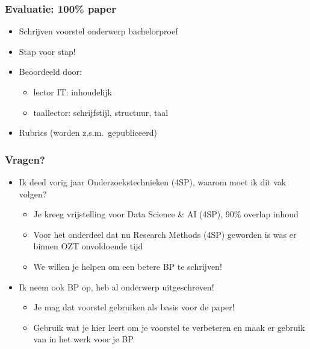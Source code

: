 \documentclass[aspectratio=169]{beamer}
\begin{document}
\begin{frame}
  \frametitle{Evaluatie: 100\% paper}

  \begin{itemize}
    \item Schrijven voorstel onderwerp bachelorproef
    \item Stap voor stap!
    \item Beoordeeld door:
          \begin{itemize}
            \item lector IT: inhoudelijk
            \item taallector: schrijfstijl, structuur, taal
          \end{itemize}
    \item Rubrics (worden z.s.m.\ gepubliceerd)
  \end{itemize}
\end{frame}

\begin{frame}
  \frametitle{Vragen?}

  \begin{itemize}
    \item Ik deed vorig jaar Onderzoekstechnieken (4SP), waarom moet ik dit vak volgen?
      \begin{itemize}
        \item Je kreeg vrijstelling voor Data Science \& AI (4SP), 90\% overlap inhoud
        \item Voor het onderdeel dat nu Research Methods (4SP) geworden is was er binnen OZT onvoldoende tijd
        \item We willen je helpen om een betere BP te schrijven!
      \end{itemize}
    \item Ik neem ook BP op, heb al onderwerp uitgeschreven!
      \begin{itemize}
        \item Je mag dat voorstel gebruiken als basis voor de paper!
        \item Gebruik wat je hier leert om je voorstel te verbeteren en maak er gebruik van in het werk voor je BP.
      \end{itemize}
  \end{itemize}
\end{frame}
\end{document}
